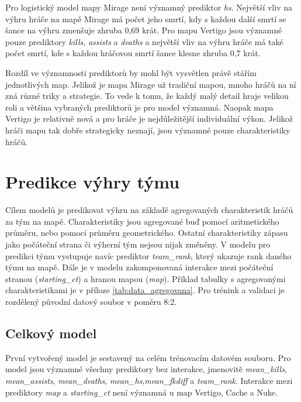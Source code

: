 Pro logistický model mapy Mirage není významný prediktor \textit{hs}. Největší vliv na výhru hráče na mapě Mirage má počet jeho smrtí, kdy s každou další smrtí se šance
na výhru zmenšuje zhruba 0,69 krát. Pro mapu Vertigo jsou významné pouze prediktory \textit{kills}, \textit{assists} a \textit{deaths} a největší vliv na výhru hráče
{\color{red}
má také počet smrtí, kde s každou hráčovou smrtí šance klesne zhruba 0,7 krát.
}

Rozdíl
{\color{red}
ve významnosti prediktorů
}
by mohl být vysvětlen právě stářím jednotlivých map. Jelikož je mapa Mirage už tradiční mapou, mnoho hráčů na ní zná různé triky a strategie. To vede k tomu, že
každý malý detail hraje velikou roli a většina vybraných prediktorů je pro model významná. Naopak mapa Vertigo je relativně nová a pro hráče je nejdůležitější individuální
výkon. Jelikož hráči mapu tak dobře strategicky neznají, jsou významné pouze charakteristiky hráčů.

\newpage
\section{Predikce výhry týmu}
Cílem modelů je predikovat výhru na základě agregovaných charakteristik hráčů za tým na mapě. Charakteristiky jsou agregované buď pomocí aritmetického průměru,
nebo pomocí průměru geometrického. Ostatní charakteristiky zápasu jako počáteční strana či výherní tým nejsou nijak změněny. V modelu pro predikci týmu vystupuje
navíc prediktor \textit{team\_rank}, který ukazuje rank daného týmu na mapě. Dále je v modelu zakomponovaná interakce
mezi počáteční stranou (\textit{starting\_ct}) a hranou mapou (\textit{map}). Příklad tabulky s agregovanými charakteristikami je v příloze \ref{tab:data_agregovana}.
Pro trénink a validaci je rozdělený původní datový soubor v poměru 8:2.

\subsection{Celkový model}



První vytvořený model je sestavený na celém trénovacím datovém souboru. Pro model jsou významné všechny prediktory bez interakce, jmenovitě \textit{mean\_kills},
\textit{mean\_assists}, \textit{mean\_deaths}, \textit{mean\_hs},\textit{mean\_fkdiff} a \textit{team\_rank}. Interakce mezi prediktory \textit{map} a
\textit{starting\_ct} není významná u map Vertigo, Cache a Nuke.

